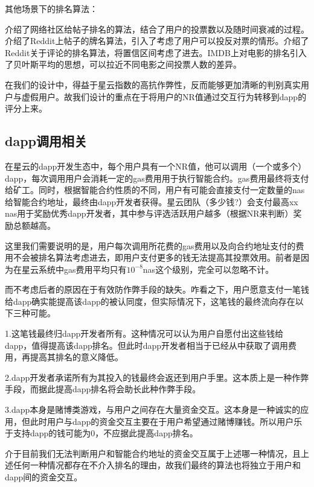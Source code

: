 其他场景下的排名算法：

\cite{salihefendic2010hacker}介绍了网络社区给帖子排名的算法，结合了用户的投票数以及随时间衰减的过程。\cite{salihefendic2010reddit}介绍了Reddit上帖子的牌名算法，引入了考虑了用户可以投反对票的情形。\cite{miller2009how}介绍了Reddit关于评论的排名算法，将置信区间考虑了进去。IMDB\cite{IMDB}上对电影的排名引入了贝叶斯平均的思想，可以拉近不同电影之间投票人数的差异。

在我们的设计中，得益于星云指数\cite{Nabulasyellowpaper}的高抗作弊性，反而能够更加清晰的判别真实用户与虚假用户。故我们设计的重点在于将用户的NR值通过交互行为转移到dapp的评分上来。



\subsection{dapp调用相关}
\label{subsec:2.3}
在星云的dapp开发生态中，每个用户具有一个NR值，他可以调用（一个或多个）dapp，每次调用用户会消耗一定的gas费用用于执行智能合约。gas费用最终将支付给矿工。同时，根据智能合约性质的不同，用户有可能会直接支付一定数量的nas给智能合约地址，最终由dapp开发者获得。星云团队（{\color{red}多少钱?}）会支付最高xx nas用于奖励优秀dapp开发者，其中参与评选活跃用户越多（根据NR来判断）奖励总额越高。

这里我们需要说明的是，用户每次调用所花费的gas费用以及向合约地址支付的费用不会被排名算法考虑进去，即用户支付更多的钱无法提高其投票效用。前者是因为在星云系统中gas费用平均只有$10^{-8}$nas这个级别，完全可以忽略不计。

而不考虑后者的原因在于有效防作弊手段的缺失。咋看之下，用户愿意支付一笔钱给dapp确实能提高该dapp的被认同度，但实际情况下，这笔钱的最终流向存在以下三种可能。

1.这笔钱最终归dapp开发者所有。这种情况可以认为用户自愿付出这些钱给dapp，值得提高该dapp排名。但此时dapp开发者相当于已经从中获取了调用费用，再提高其排名的意义降低。

2.dapp开发者承诺所有为其投入的钱最终会返还到用户手里。这本质上是一种作弊手段，而据此提高dapp排名将会助长此种作弊手段。

3.dapp本身是赌博类游戏，与用户之间存在大量资金交互。这本身是一种诚实的应用，但此时用户与dapp的资金交互主要在于用户希望通过赌博赚钱。所以用户乐于支持dapp的钱可能为0，不应据此提高dapp排名。

介于目前我们无法判断用户和智能合约地址的资金交互属于上述哪一种情况，且上述任何一种情况都存在不介入排名的理由，故我们最终的算法也将独立于用户和dapp间的资金交互。
